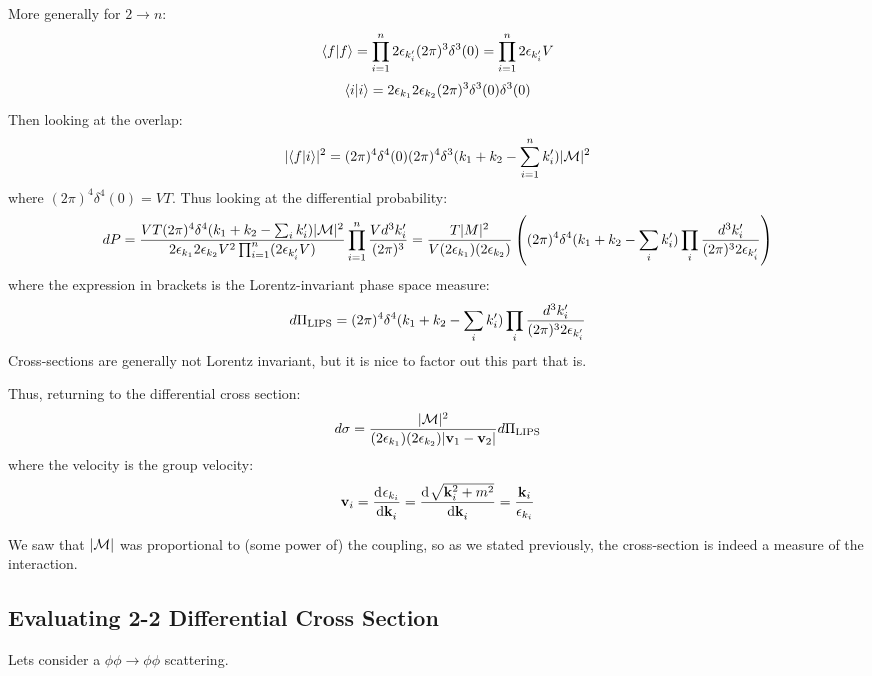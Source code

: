 More generally for $2 \to n$:
\begin{equation}
    \langle f \lvert f \rangle = \prod_{i=1}^n 2\epsilon_{k_i'}(2\pi)^3\delta^3(0) =  \prod_{i=1}^n 2\epsilon_{k_i'}V
\end{equation}
\begin{equation}
    \langle i \lvert i \rangle = 2\epsilon_{k_1}2\epsilon_{k_2}(2\pi)^3\delta^3(0)\delta^3(0)
\end{equation}
Then looking at the overlap:
\begin{equation}
    \lvert \langle f \lvert i \rangle \rvert^2 = (2\pi)^4\delta^4(0)(2\pi)^4\delta^3(k_1 + k_2 - \sum_{i=1}^n k_i')\lvert \mathcal{M} \rvert^2
\end{equation}
where $(2\pi)^4\delta^4(0) = VT$. Thus looking at the differential probability:
\begin{equation}
    dP = \frac{VT(2\pi)^4\delta^4(k_1 + k_2 - \sum_{i}k_i')\lvert \mathcal{M} \rvert^2}{2\epsilon_{k_1}2\epsilon_{k_2}V^2\prod_{i=1}^n(2\epsilon_{k_i'}V)}\prod_{i=1}^n\frac{Vd^3k_i'}{(2\pi)^3} = \frac{T\lvert M \rvert^2}{V(2\epsilon_{k_1})(2\epsilon_{k_2})}\left((2\pi)^4\delta^4(k_1 + k_2 - \sum_i k_i')\prod_i \frac{d^3k_i'}{(2\pi)^32\epsilon_{k_i'}}\right)
\end{equation}
where the expression in brackets is the Lorentz-invariant phase space measure:
\begin{equation}
    d\Pi_{\text{LIPS}} = (2\pi)^4\delta^4(k_1 + k_2 - \sum_i k_i')\prod_i \frac{d^3k_i'}{(2\pi)^32\epsilon_{k_i'}}
\end{equation}
Cross-sections are generally not Lorentz invariant, but it is nice to factor out this part that is.

Thus, returning to the differential cross section:
\begin{equation}
    d\sigma = \frac{\lvert \mathcal{M} \rvert^2}{(2\epsilon_{k_1})(2\epsilon_{k_2})\lvert \mathbf{v}_1 - \mathbf{v}_2 \rvert}d\Pi_{\text{LIPS}}
\end{equation}
where the velocity is the group velocity:
\begin{equation}
    \v{v}_i = \dod{\e_{k_i}}{\v{k}_i} = \dod{\sqrt{\v{k}_i^2 + m^2}}{\v{k}_i} = \frac{\v{k}_i}{\e_{k_i}}
\end{equation}

We saw that $\lvert \mathcal{M} \rvert$ was proportional to (some power of) the coupling, so as we stated previously, the cross-section is indeed a measure of the interaction.

\subsection{Evaluating 2-2 Differential Cross Section}
Lets consider a $\phi\phi \to \phi\phi$ scattering. 

